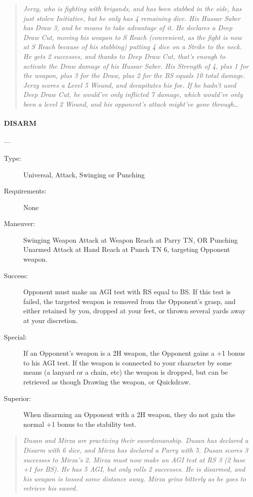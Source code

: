 \documentclass[oneside,11pt,english]{book}
\begin{document}
\begin{quotation}
\emph{Jerzy, who is fighting with brigands, and has been stabbed in the side, has just stolen Initiative, but he only has 4 remaining dice. His Hussar Saber has Draw 3, and he means to take advantage of it. He declares a Deep Draw Cut, moving his weapon to S Reach (convenient, as the fight is now at S Reach because of his stabbing) putting 4 dice on a Strike to the neck. He gets 2 successes, and thanks to Deep Draw Cut, that’s enough to activate the Draw damage of his Hussar Saber. His Strength of 4, plus 1 for the weapon, plus 3 for the Draw, plus 2 for the BS equals 10 total damage. Jerzy scores a Level 5 Wound, and decapitates his foe. If he hadn’t used Deep Draw Cut, he would’ve only inflicted 7 damage, which would’ve only been a level 2 Wound, and his opponent’s attack might’ve gone through\ldots}
\end{quotation}

\paragraph{\large\label{man:DISARM} DISARM}---\quad{\large[X+1]}
\vspace{-10pt}\begin{description}
\item [Type:] Universal, Attack, Swinging or Punching 
\item [Requirements:] None 
\item [Maneuver:] Swinging Weapon Attack at Weapon Reach at Parry TN, OR Punching Unarmed Attack at Hand Reach at Punch TN 6, targeting Opponent weapon. 
\item [Success:] Opponent must make an AGI test with RS equal to BS. If this test is failed, the targeted weapon is removed from the Opponent's grasp, and either retained by you, dropped at your feet, or thrown several yards away at your discretion.
\item [Special:] If an Opponent’s weapon is a 2H weapon, the Opponent gains a +1 bonus to his AGI test.  If the weapon is connected to your character by some means (a lanyard or a chain, etc) the weapon is dropped, but can be retrieved as though Drawing the weapon, or Quickdraw. 
\item [Superior:] When disarming an Opponent with a 2H weapon, they do not gain the normal +1 bonus to the 
stability test.
\end{description}
\begin{quotation}
\emph{Dusan and Mirza are practicing their swordsmanship. Dusan has declared a Disarm with 6 dice, and Mirza has declared a 
Parry with 5. Dusan scores 3 successes to Mirza’s 2. Mirza must now make an AGI test at RS 3 (2 base +1 for BS). He has 5 AGI, but only rolls 2 successes. He is disarmed, and his weapon is tossed some distance away. Mirza grins bitterly as he goes to retrieve his sword.}
\end{quotation}
\end{document}
